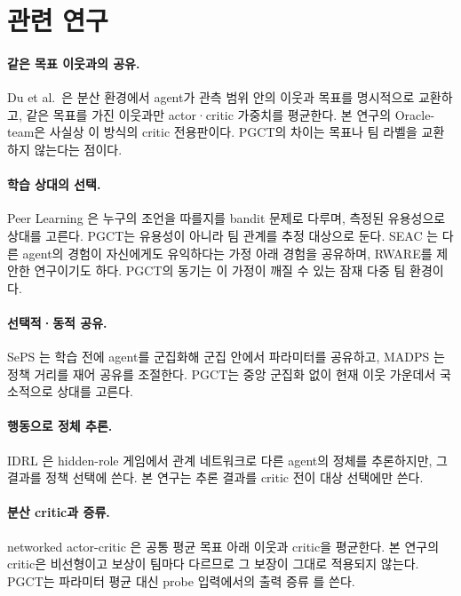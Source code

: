 \documentclass[10pt]{article}
\begin{document}
\section{관련 연구}

\paragraph{같은 목표 이웃과의 공유.}
Du et al.\ \cite{du2025}은 분산 환경에서 agent가 관측 범위 안의 이웃과 목표를 명시적으로 교환하고, 같은 목표를 가진 이웃과만 actor·critic 가중치를 평균한다. 본 연구의 Oracle-team은 사실상 이 방식의 critic 전용판이다. PGCT의 차이는 목표나 팀 라벨을 교환하지 않는다는 점이다.

\paragraph{학습 상대의 선택.}
Peer Learning \cite{derstroff2024}은 누구의 조언을 따를지를 bandit 문제로 다루며, 측정된 유용성으로 상대를 고른다. PGCT는 유용성이 아니라 팀 관계를 추정 대상으로 둔다.
SEAC \cite{christianos2020}는 다른 agent의 경험이 자신에게도 유익하다는 가정 아래 경험을 공유하며, RWARE를 제안한 연구이기도 하다. PGCT의 동기는 이 가정이 깨질 수 있는 잠재 다중 팀 환경이다.

\paragraph{선택적·동적 공유.}
SePS \cite{christianos2021}는 학습 전에 agent를 군집화해 군집 안에서 파라미터를 공유하고, MADPS \cite{hu2024}는 정책 거리를 재어 공유를 조절한다. PGCT는 중앙 군집화 없이 현재 이웃 가운데서 국소적으로 상대를 고른다.

\paragraph{행동으로 정체 추론.}
IDRL \cite{idrl}은 hidden-role 게임에서 관계 네트워크로 다른 agent의 정체를 추론하지만, 그 결과를 정책 선택에 쓴다. 본 연구는 추론 결과를 critic 전이 대상 선택에만 쓴다.

\paragraph{분산 critic과 증류.}
networked actor-critic \cite{zhang2018}은 공통 평균 목표 아래 이웃과 critic을 평균한다. 본 연구의 critic은 비선형이고 보상이 팀마다 다르므로 그 보장이 그대로 적용되지 않는다. PGCT는 파라미터 평균 대신 probe 입력에서의 출력 증류 \cite{rusu2016}를 쓴다.
\end{document}
